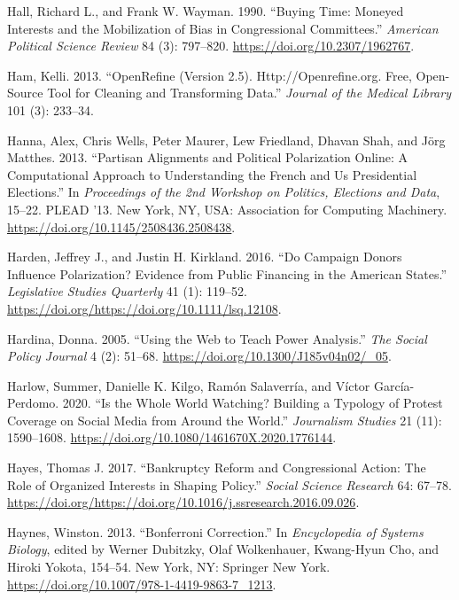 \documentclass[12pt,]{article}
\begin{document}
\leavevmode\hypertarget{ref-hall1990}{}%
Hall, Richard L., and Frank W. Wayman. 1990. ``Buying Time: Moneyed
Interests and the Mobilization of Bias in Congressional Committees.''
\emph{American Political Science Review} 84 (3): 797--820.
\url{https://doi.org/10.2307/1962767}.

\leavevmode\hypertarget{ref-openrefine}{}%
Ham, Kelli. 2013. ``OpenRefine (Version 2.5). Http://Openrefine.org.
Free, Open-Source Tool for Cleaning and Transforming Data.''
\emph{Journal of the Medical Library} 101 (3): 233--34.

\leavevmode\hypertarget{ref-hanna2013}{}%
Hanna, Alex, Chris Wells, Peter Maurer, Lew Friedland, Dhavan Shah, and
Jörg Matthes. 2013. ``Partisan Alignments and Political Polarization
Online: A Computational Approach to Understanding the French and Us
Presidential Elections.'' In \emph{Proceedings of the 2nd Workshop on
Politics, Elections and Data}, 15--22. PLEAD '13. New York, NY, USA:
Association for Computing Machinery.
\url{https://doi.org/10.1145/2508436.2508438}.

\leavevmode\hypertarget{ref-harden2016}{}%
Harden, Jeffrey J., and Justin H. Kirkland. 2016. ``Do Campaign Donors
Influence Polarization? Evidence from Public Financing in the American
States.'' \emph{Legislative Studies Quarterly} 41 (1): 119--52.
\url{https://doi.org/https://doi.org/10.1111/lsq.12108}.

\leavevmode\hypertarget{ref-hardina2005}{}%
Hardina, Donna. 2005. ``Using the Web to Teach Power Analysis.''
\emph{The Social Policy Journal} 4 (2): 51--68.
\url{https://doi.org/10.1300/J185v04n02/_05}.

\leavevmode\hypertarget{ref-harlow2020}{}%
Harlow, Summer, Danielle K. Kilgo, Ramón Salaverría, and Víctor
García-Perdomo. 2020. ``Is the Whole World Watching? Building a Typology
of Protest Coverage on Social Media from Around the World.''
\emph{Journalism Studies} 21 (11): 1590--1608.
\url{https://doi.org/10.1080/1461670X.2020.1776144}.

\leavevmode\hypertarget{ref-hayes2017}{}%
Hayes, Thomas J. 2017. ``Bankruptcy Reform and Congressional Action: The
Role of Organized Interests in Shaping Policy.'' \emph{Social Science
Research} 64: 67--78.
\url{https://doi.org/https://doi.org/10.1016/j.ssresearch.2016.09.026}.

\leavevmode\hypertarget{ref-bonferroni}{}%
Haynes, Winston. 2013. ``Bonferroni Correction.'' In \emph{Encyclopedia
of Systems Biology}, edited by Werner Dubitzky, Olaf Wolkenhauer,
Kwang-Hyun Cho, and Hiroki Yokota, 154--54. New York, NY: Springer New
York. \url{https://doi.org/10.1007/978-1-4419-9863-7_1213}.
\end{document}
